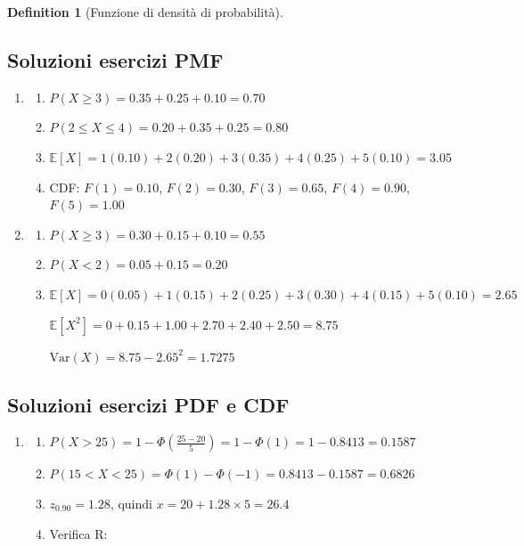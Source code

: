 \documentclass[
  letterpaper,
  DIV=11,
  numbers=noendperiod,
  oneside]{scrreprt}
\theoremstyle{definition}
\theoremstyle{plain}
\theoremstyle{definition}
\newtheorem{definition}{Definition}[chapter]
\theoremstyle{remark}
\begin{document}
\begin{definition}[Funzione di densità di
probabilità]
\begin{tcolorbox}
\subsection*{Soluzioni esercizi PMF}\label{soluzioni-esercizi-pmf}

\begin{enumerate}
\def\labelenumi{\arabic{enumi}.}
\setcounter{enumi}{3}
\item
  \begin{enumerate}
  \def\labelenumii{\alph{enumii}.}
  \item
    \(P(X \geq 3) = 0.35 + 0.25 + 0.10 = 0.70\)
  \item
    \(P(2 \leq X \leq 4) = 0.20 + 0.35 + 0.25 = 0.80\)
  \item
    \(\mathbb{E}[X] = 1(0.10) + 2(0.20) + 3(0.35) + 4(0.25) + 5(0.10) = 3.05\)
  \item
    CDF: \(F(1) = 0.10\), \(F(2) = 0.30\), \(F(3) = 0.65\),
    \(F(4) = 0.90\), \(F(5) = 1.00\)
  \end{enumerate}
\item
  \begin{enumerate}
  \def\labelenumii{\alph{enumii}.}
  \item
    \(P(X \geq 3) = 0.30 + 0.15 + 0.10 = 0.55\)
  \item
    \(P(X < 2) = 0.05 + 0.15 = 0.20\)
  \item
    \(\mathbb{E}[X] = 0(0.05) + 1(0.15) + 2(0.25) + 3(0.30) + 4(0.15) + 5(0.10) = 2.65\)

    \(\mathbb{E}[X^2] = 0 + 0.15 + 1.00 + 2.70 + 2.40 + 2.50 = 8.75\)

    \(\text{Var}(X) = 8.75 - 2.65^2 = 1.7275\)
  \end{enumerate}
\end{enumerate}

\subsection*{Soluzioni esercizi PDF e
CDF}\label{soluzioni-esercizi-pdf-e-cdf}

\begin{enumerate}
\def\labelenumi{\arabic{enumi}.}
\setcounter{enumi}{5}
\item
  \begin{enumerate}
  \def\labelenumii{\alph{enumii}.}
  \item
    \(P(X > 25) = 1 - \Phi\left(\frac{25-20}{5}\right) = 1 - \Phi(1) = 1 - 0.8413 = 0.1587\)
  \item
    \(P(15 < X < 25) = \Phi(1) - \Phi(-1) = 0.8413 - 0.1587 = 0.6826\)
  \item
    \(z_{0.90} = 1.28\), quindi \(x = 20 + 1.28 \times 5 = 26.4\)
  \item
    Verifica R:
  \end{enumerate}


\end{enumerate}
\end{tcolorbox}
\end{definition}
\end{document}
